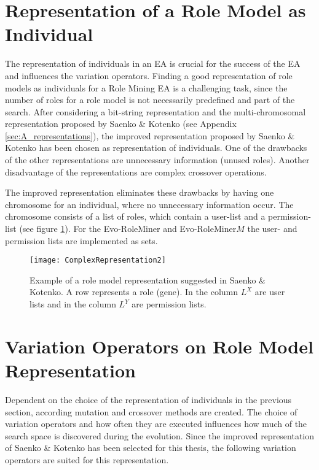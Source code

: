     \section{Representation of a Role Model as Individual}
    The representation of individuals in an EA is crucial for the success of the EA and influences the variation operators. Finding a good representation of role models as individuals for a Role Mining EA is a challenging task, since the number of roles for a role model is not necessarily predefined and part of the search. After considering a bit-string representation and the multi-chromosomal representation proposed by Saenko \& Kotenko\cite{Igor} (see Appendix \ref{sec:A_representations}), the improved representation proposed by Saenko \& Kotenko\cite{saenko2012design} has been chosen as representation of individuals. One of the drawbacks of the other representations are unnecessary information (unused roles). Another disadvantage of the representations are complex crossover operations.
    
    The improved representation eliminates these drawbacks by having one chromosome for an individual, where no unnecessary information occur. The chromosome consists of a list of roles, which contain a user-list and a permission-list (see figure \ref{fig:representation3}). For the Evo-RoleMiner and Evo-RoleMiner$M$ the user- and permission lists are implemented as sets.
        
    \begin{figure}[H]
        \centering
        \texttt{[image: ComplexRepresentation2]}
        \caption{Example of a role model representation suggested in Saenko \& Kotenko\cite{saenko2012design}. A row represents a role (gene). In the column $L^X$ are user lists and in the column $L^Y$ are permission lists.}
        \label{fig:representation3}
    \end{figure}
    
    \section{Variation Operators on Role Model Representation}
    Dependent on the choice of the representation of individuals in the previous section, according mutation and crossover methods are created. The choice of variation operators and how often they are executed influences how much of the search space is discovered during the evolution. Since the improved representation of Saenko \& Kotenko\cite{saenko2012design} has been selected for this thesis, the following variation operators are suited for this representation.
    
